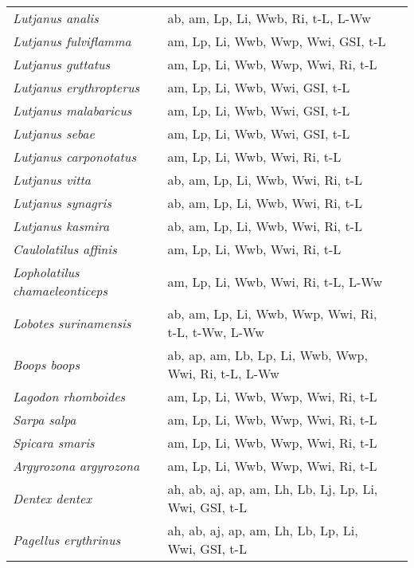 {\begin{longtable}[c]{p{3.5cm}p{5.5cm}p{5.5cm}}
\emph{Lutjanus analis} &  ab, am, Lp, Li, Wwb, Ri, t-L, L-Ww & \citet{Burt2002} \\
\emph{Lutjanus fulviflamma} &  am, Lp, Li, Wwb, Wwp, Wwi, GSI, t-L & \citet{HamaKuma1992,GranAbde2006} \\
\emph{Lutjanus guttatus} &  am, Lp, Li, Wwb, Wwp, Wwi, Ri, t-L & \citet{AmezSoto2006,HamaKuma1992} \\
\emph{Lutjanus erythropterus} &  am, Lp, Li, Wwb, Wwi, GSI, t-L & \citet{NewmCapp2000,McPhSqui1992} \\
\emph{Lutjanus malabaricus} &  am, Lp, Li, Wwb, Wwi, GSI, t-L & \citet{NewmCapp2000,McPhSqui1992} \\
\emph{Lutjanus sebae} &  am, Lp, Li, Wwb, Wwi, GSI, t-L & \citet{NewmCapp2000,McPhSqui1992} \\
\emph{Lutjanus carponotatus} &  am, Lp, Li, Wwb, Wwi, Ri, t-L & \citet{NewmCapp2000} \\
\emph{Lutjanus vitta} &  ab, am, Lp, Li, Wwb, Wwi, Ri, t-L & \citet{NewmCapp2000} \\
\emph{Lutjanus synagris} &  ab, am, Lp, Li, Wwb, Wwi, Ri, t-L & \citet{AschFrei2017} \\
\emph{Lutjanus kasmira} &  ab, am, Lp, Li, Wwb, Wwi, Ri, t-L & \citet{MoraRals1990} \\
\emph{Caulolatilus affinis} &  am, Lp, Li, Wwb, Wwi, Ri, t-L & \citet{RamiMelo2011} \\
\emph{Lopholatilus chamaeleonticeps} &  am, Lp, Li, Wwb, Wwi, Ri, t-L, L-Ww & \citet{Daws2021} \\
\emph{Lobotes surinamensis} &  ab, am, Lp, Li, Wwb, Wwp, Wwi, Ri, t-L, t-Ww, L-Ww & \citet{Mick2016,FranOgle2001} \\
\emph{Boops boops} &  ab, ap, am, Lb, Lp, Li, Wwb, Wwp, Wwi, Ri, t-L, L-Ww & \citet{Hour2015,BoufTamo2018,BoufZero2018} \\
\emph{Lagodon rhomboides} &  am, Lp, Li, Wwb, Wwp, Wwi, Ri, t-L & \citet{Nels2002} \\
\emph{Sarpa salpa} &  am, Lp, Li, Wwb, Wwp, Wwi, Ri, t-L & \citet{WaltBeck1997} \\
\emph{Spicara smaris} &  am, Lp, Li, Wwb, Wwp, Wwi, Ri, t-L & \citet{TsanFili1994} \\
\emph{Argyrozona argyrozona} &  am, Lp, Li, Wwb, Wwp, Wwi, Ri, t-L & \citet{BrouGrif2004} \\
\emph{Dentex dentex} &  ah, ab, aj, ap, am, Lh, Lb, Lj, Lp, Li, Wwi, GSI, t-L & \citet{LikaKooy2014,Papa2013} \\
\emph{Pagellus erythrinus} &  ah, ab, aj, ap, am, Lh, Lb, Lp, Li, Wwi, GSI, t-L & \citet{LikaKooy2014,Papa2013} \\

\end{longtable}}
